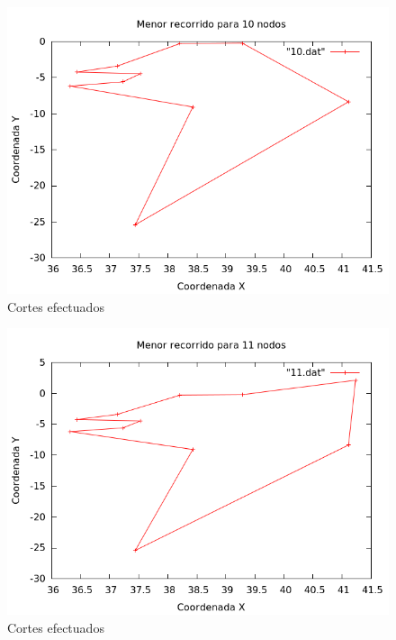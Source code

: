 \begin{figure}[H]
    \centering
    \includegraphics[scale=0.5]{../TSP/Graficas/10.png}
    \caption{Cortes efectuados}
\end{figure}

\begin{figure}[H]
    \centering
    \includegraphics[scale=0.5]{../TSP/Graficas/11.png}
    \caption{Cortes efectuados}
\end{figure}

